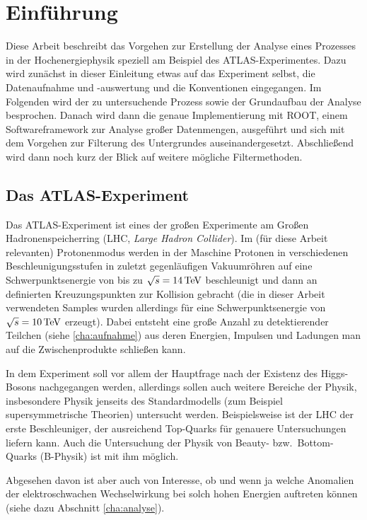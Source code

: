 \section{Einführung}
Diese Arbeit beschreibt das Vorgehen zur Erstellung der Analyse eines Prozesses
in der Hochenergiephysik speziell am Beispiel des ATLAS-Experimentes. Dazu wird
zunächst in dieser Einleitung etwas auf das Experiment selbst, die Datenaufnahme
und -auswertung und die Konventionen eingegangen. Im Folgenden wird der zu
untersuchende Prozess sowie der Grundaufbau der Analyse besprochen.  Danach wird
dann die genaue Implementierung mit ROOT, einem Softwareframework zur Analyse
großer Datenmengen, ausgeführt und sich mit dem Vorgehen zur Filterung des
Untergrundes auseinandergesetzt. Abschließend wird dann noch kurz der Blick auf
weitere mögliche Filtermethoden.

\subsection{Das ATLAS-Experiment}
Das ATLAS-Experiment ist eines der großen Experimente am Großen
Hadronenspeicherring (LHC, \emph{Large Hadron Collider}). Im (für diese Arbeit
relevanten) Protonenmodus werden in der Maschine Protonen in verschiedenen
Beschleunigungsstufen in zuletzt gegenläufigen Vakuumröhren auf eine
Schwerpunktsenergie von bis zu $\sqrt{s} = \unit[14]{TeV}$ beschleunigt und dann
an definierten Kreuzungspunkten zur Kollision gebracht (die in dieser Arbeit
verwendeten Samples wurden allerdings für eine Schwerpunktsenergie von $\sqrt s
= \unit[10]{TeV}$ erzeugt). Dabei entsteht eine große Anzahl zu detektierender
Teilchen (siehe \ref{cha:aufnahme}) aus deren Energien, Impulsen und Ladungen
man auf die Zwischenprodukte schließen kann.

In dem Experiment soll vor allem der Hauptfrage nach der Existenz des
Higgs-Bosons nachgegangen werden, allerdings sollen auch weitere Bereiche der
Physik, insbesondere Physik jenseits des Standardmodells (zum Beispiel
supersymmetrische Theorien) untersucht werden. Beispielsweise ist der LHC der
erste Beschleuniger, der ausreichend Top-Quarks für genauere Untersuchungen
liefern kann. Auch die Untersuchung der Physik von Beauty- bzw.\ Bottom-Quarks
(B-Physik) ist mit ihm möglich.

Abgesehen davon ist aber auch von Interesse, ob und wenn ja welche Anomalien der
elektroschwachen Wechselwirkung bei solch hohen Energien auftreten können (siehe
dazu Abschnitt \ref{cha:analyse}).

